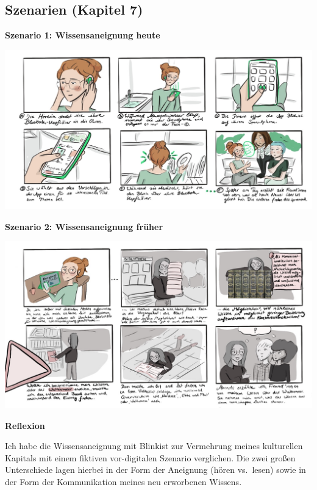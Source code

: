 \documentclass[
  a4paper,
]{book}
\begin{document}
\subsection*{Szenarien (Kapitel 7)}\label{szenarien-kapitel-7}

\textbf{Szenario 1: Wissensaneignung heute}

\begin{center}\includegraphics{Figures/07-Bsp.-Szenario1} \end{center}

\textbf{Szenario 2: Wissensaneignung früher}

\begin{center}\includegraphics{Figures/07-Bsp.-Szenario2} \end{center}

\textbf{Reflexion}

Ich habe die Wissensaneignung mit Blinkist zur Vermehrung meines kulturellen Kapitals mit einem fiktiven vor-digitalen Szenario verglichen. Die zwei großen Unterschiede lagen hierbei in der Form der Aneignung (hören vs.~lesen) sowie in der Form der Kommunikation meines neu erworbenen Wissens.
\end{document}
